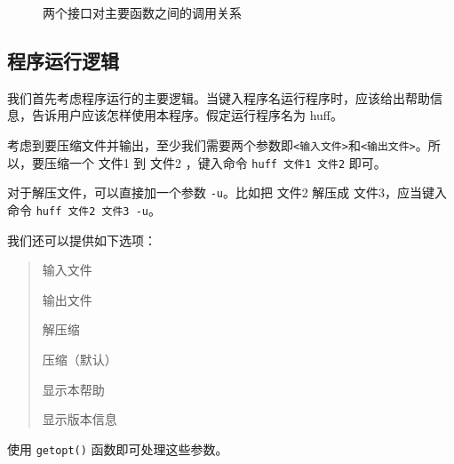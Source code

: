 \begin{sidewaysfigure}


\caption{\label{funcall}两个接口对主要函数之间的调用关系}
\end{sidewaysfigure}


\subsection{程序运行逻辑}

我们首先考虑程序运行的主要逻辑。当键入程序名运行程序时，应该给出帮助信息，告诉用户应该怎样使用本程序。假定运行程序名为 {\sf huff}。

考虑到要压缩文件并输出，至少我们需要两个参数即\verb|<输入文件>|和\verb|<输出文件>|。所以，要压缩一个 {\sf 文件1} 到 {\sf 文件2} ，键入命令 \verb|huff 文件1 文件2| 即可。

对于解压文件，可以直接加一个参数 \verb|-u|。比如把 {\sf 文件2} 解压成 {\sf 文件3}，应当键入命令 \verb|huff 文件2 文件3 -u|。

我们还可以提供如下选项：
\begin{quote}
\begin{description}[topsep=0pt,partopsep=0pt,itemsep=0pt,parsep=0pt]
\item[-i]   输入文件
\item[-o]   输出文件
\item[-u]   解压缩
\item[-z]   压缩（默认）
\item[-h]   显示本帮助
\item[-v]   显示版本信息
\end{description}
\end{quote}
使用 \verb|getopt()| 函数即可处理这些参数。

